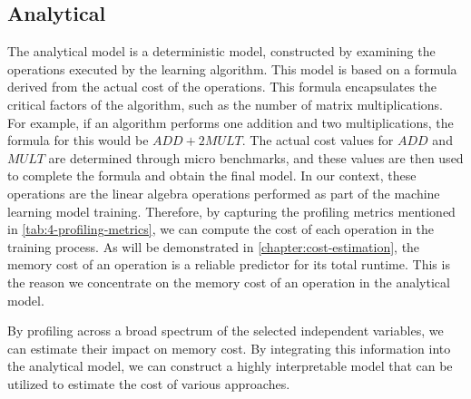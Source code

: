 \subsection{Analytical}
The analytical model is a deterministic model, constructed by examining the operations executed by the learning algorithm. This model is based on a formula derived from the actual cost of the operations. This formula encapsulates the critical factors of the algorithm, such as the number of matrix multiplications. For example, if an algorithm performs one addition and two multiplications, the formula for this would be $ADD + 2MULT$. The actual cost values for $ADD$ and $MULT$ are determined through micro benchmarks, and these values are then used to complete the formula and obtain the final model. In our context, these operations are the linear algebra operations performed as part of the machine learning model training. Therefore, by capturing the profiling metrics mentioned in \autoref{tab:4-profiling-metrics}, we can compute the cost of each operation in the training process. As will be demonstrated in \autoref{chapter:cost-estimation}, the memory cost of an operation is a reliable predictor for its total runtime. This is the reason we concentrate on the memory cost of an operation in the analytical model.



By profiling across a broad spectrum of the selected independent variables, we can estimate their impact on memory cost. By integrating this information into the analytical model, we can construct a highly interpretable model that can be utilized to estimate the cost of various approaches.


